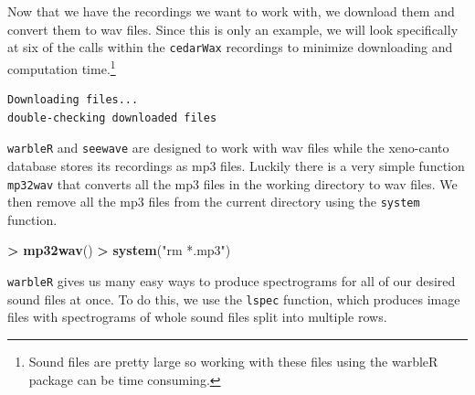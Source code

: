 \documentclass[
]{krantz}
\makeatletter
\newenvironment{Shaded}{\begin{snugshade}}{\end{snugshade}}
\newcommand{\DataTypeTok}[1]{\textcolor[rgb]{0.27,0.27,0.27}{#1}}
\newcommand{\DecValTok}[1]{\textcolor[rgb]{0.06,0.06,0.06}{#1}}
\newcommand{\KeywordTok}[1]{\textcolor[rgb]{0.27,0.27,0.27}{\textbf{#1}}}
\newcommand{\NormalTok}[1]{#1}
\newcommand{\OperatorTok}[1]{\textcolor[rgb]{0.43,0.43,0.43}{\textbf{#1}}}
\newcommand{\StringTok}[1]{\textcolor[rgb]{0.5,0.5,0.5}{#1}}
\newenvironment{kframe}{%
\medskip{}
\setlength{\fboxsep}{.8em}
 \def\at@end@of@kframe{}%
 \ifinner\ifhmode%
  \def\at@end@of@kframe{\end{minipage}}%
  \begin{minipage}{\columnwidth}%
 \fi\fi%
 \def\FrameCommand##1{\hskip\@totalleftmargin \hskip-\fboxsep
 \colorbox{shadecolor}{##1}\hskip-\fboxsep
     \hskip-\linewidth \hskip-\@totalleftmargin \hskip\columnwidth}%
 \MakeFramed {\advance\hsize-\width
   \@totalleftmargin\z@ \linewidth\hsize
   \@setminipage}}%
 {\par\unskip\endMakeFramed%
 \at@end@of@kframe}
\renewenvironment{Shaded}{\begin{kframe}}{\end{kframe}}
\makeatother
\begin{document}
Now that we have the recordings we want to work with, we download them and convert them to wav files. Since this is only an example, we will look specifically at six of the calls within the \texttt{cedarWax} recordings to minimize downloading and computation time.\footnote{Sound files are pretty large so working with these files using the warbleR package can be time consuming.}

\begin{Shaded}
\end{Shaded}

\begin{verbatim}
Downloading files...
double-checking downloaded files
\end{verbatim}

\texttt{warbleR} and \texttt{seewave} are designed to work with wav files while the xeno-canto database stores its recordings as mp3 files. Luckily there is a very simple function \texttt{mp32wav} that converts all the mp3 files in the working directory to wav files. We then remove all the mp3 files from the current directory using the \texttt{system} function.

\begin{Shaded}
\begin{Highlighting}[]
\OperatorTok{\textgreater{}}\StringTok{ }\KeywordTok{mp32wav}\NormalTok{()}
\OperatorTok{\textgreater{}}\StringTok{ }\KeywordTok{system}\NormalTok{(}\StringTok{"rm *.mp3"}\NormalTok{)}
\end{Highlighting}
\end{Shaded}

\texttt{warbleR} gives us many easy ways to produce spectrograms for all of our desired sound files at once. To do this, we use the \texttt{lspec} function, which produces image files with spectrograms of whole sound files split into multiple rows.
\end{document}
